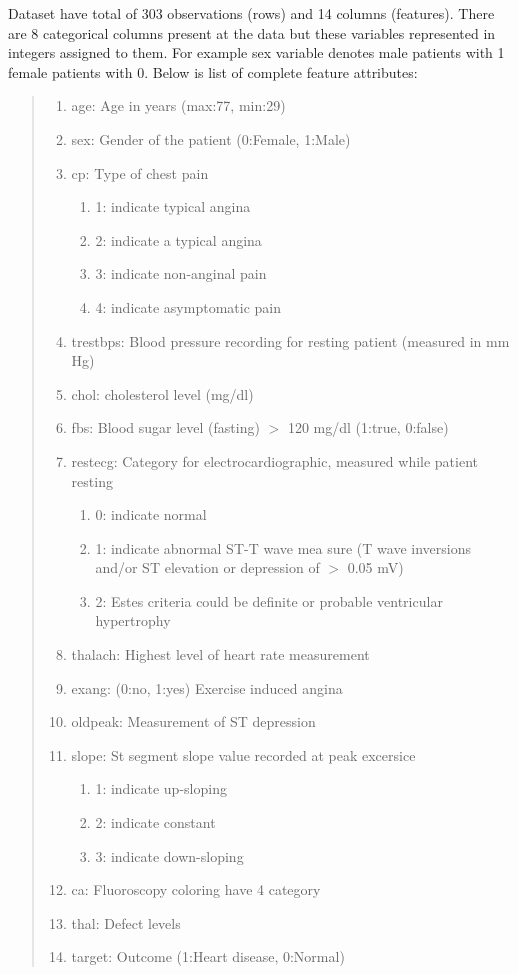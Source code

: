 \documentclass[12pt]{article}
\begin{document}
Dataset have total of 303 observations (rows) and 14 columns (features). There are 8 categorical columns present at the data but these variables represented in integers assigned to them. For example sex variable denotes male patients with 1 female patients with 0. Below is list of complete feature attributes\cite{uci-source}:
\begin{quote}
\begin{enumerate}
    \item age: Age in years (max:77, min:29)
    \item sex: Gender of the patient (0:Female, 1:Male)
    \item cp: Type of chest pain 
    \begin{enumerate}
        \item 1: indicate typical angina
        \item 2: indicate a typical angina 
        \item 3: indicate non-anginal pain 
        \item 4: indicate asymptomatic pain
    \end{enumerate}
    \item trestbps: Blood pressure recording for resting patient (measured in mm Hg)
    \item chol: cholesterol level (mg/dl) 
    \item fbs: Blood sugar level (fasting) $>$ 120 mg/dl (1:true, 0:false)
    \item restecg: Category for electrocardiographic, measured while patient resting
    \begin{enumerate}
        \item 0: indicate normal 
        \item 1: indicate abnormal ST-T wave mea    sure (T wave inversions and/or ST elevation or depression of $>$ 0.05 mV)
        \item 2: Estes criteria could be definite or probable ventricular hypertrophy
    \end{enumerate}
    \item thalach: Highest level of heart rate measurement
    \item exang: (0:no, 1:yes) Exercise induced angina 
    \item oldpeak: Measurement of ST depression
    \item slope: St segment slope value recorded at peak excersice
    \begin{enumerate}
        \item 1: indicate up-sloping 
        \item 2: indicate constant
        \item 3: indicate down-sloping
    \end{enumerate}
    \item ca: Fluoroscopy coloring have 4 category
    \item thal: Defect levels
    \item target: Outcome (1:Heart disease, 0:Normal)
\end{enumerate}
\end{quote}
\end{document}
